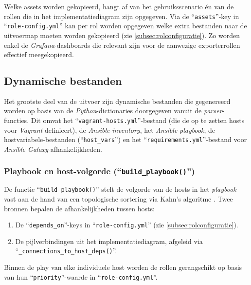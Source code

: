 Welke assets worden gekopieerd, hangt af van het gebruiksscenario én van de rollen die in het implementatiediagram zijn opgegeven. Via de ``\texttt{assets}''-key in ``\texttt{role-config.yml}'' kan per rol worden opgegeven welke extra bestanden naar de uitvoermap moeten worden gekopieerd (zie \autoref{subsec:rolconfiguratie}). Zo worden enkel de \emph{Grafana}-dashboards die relevant zijn voor de aanwezige exporterrollen effectief meegekopieerd.

\subsection{Dynamische bestanden}%
\label{subsec:dynamische_bestanden}

Het grootste deel van de uitvoer zijn dynamische bestanden die gegenereerd worden op basis van de \emph{Python}-dictionaries doorgegeven vanuit de \emph{parser}-functies. Dit omvat het ``\texttt{vagrant-hosts.yml}''-bestand (die de op te zetten hosts voor \emph{Vagrant} definieert), de \emph{Ansible}-\emph{inventory}, het \emph{Ansible}-\emph{playbook}, de hostvariabele-bestanden (``\texttt{host\_vars}'') en het ``\texttt{requirements.yml}''-bestand voor \emph{Ansible Galaxy}-afhankelijkheden.

\subsubsection{Playbook en host-volgorde (``\texttt{build\_playbook()}'')}

De functie ``\texttt{build\_playbook()}'' stelt de volgorde van de hosts in het \emph{playbook} vast aan de hand van een topologische sortering via Kahn's algoritme \autocite{Kahn1962}. Twee bronnen bepalen de afhankelijkheden tussen hosts:

\begin{enumerate}
  \item De ``\texttt{depends\_on}''-keys in ``\texttt{role-config.yml}'' (zie \autoref{subsec:rolconfiguratie}).
  \item De pijlverbindingen uit het implementatiediagram, afgeleid via \\``\texttt{\_connections\_to\_host\_deps()}''.
\end{enumerate}

Binnen de play van elke individuele host worden de rollen gerangschikt op basis van hun ``\texttt{priority}''-waarde in ``\texttt{role-config.yml}''.

